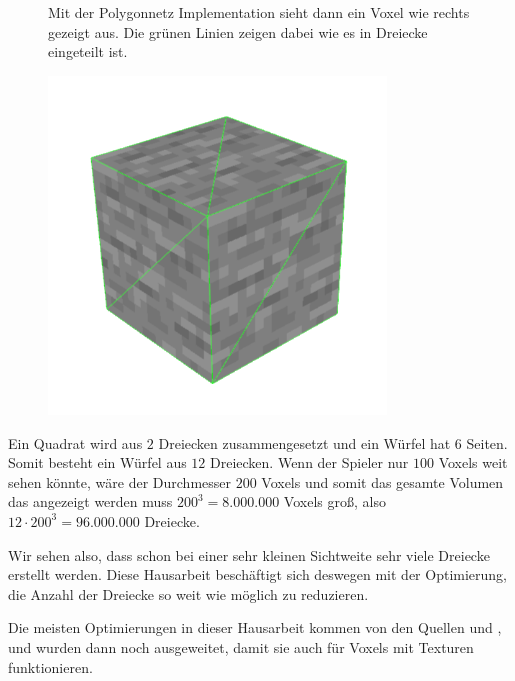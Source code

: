 \begin{figure}[ht]
	\begin{minipage}[c]{0.48\textwidth}
Mit der Polygonnetz Implementation sieht dann ein
Voxel wie rechts gezeigt aus.
Die grünen Linien zeigen dabei wie es in Dreiecke
eingeteilt ist.
	\end{minipage}
	\begin{minipage}[c]{0.5\textwidth}
		\begin{center}
\includegraphics[width=0.8\textwidth]{../assets/single_voxel.png}
		\end{center}
	\end{minipage}\hfill
\end{figure}

\goodbreak

Ein Quadrat wird aus $2$ Dreiecken zusammengesetzt
und ein Würfel hat $6$ Seiten. Somit besteht ein Würfel
aus $12$ Dreiecken. Wenn der Spieler nur $100$ Voxels
weit sehen könnte, wäre der Durchmesser $200$ Voxels
und somit das gesamte Volumen das angezeigt werden
muss $200^3 = 8.000.000$ Voxels groß, also
$12 \cdot 200^3 = 96.000.000$ Dreiecke.

Wir sehen also, dass schon bei einer sehr kleinen
Sichtweite sehr viele Dreiecke erstellt werden.
Diese Hausarbeit beschäftigt sich deswegen mit der
Optimierung, die Anzahl der Dreiecke so weit wie
möglich zu reduzieren.

Die meisten Optimierungen in dieser Hausarbeit
kommen von den Quellen \cite{yt_bin_greedy_mesher}
und \cite{gh_bin_greedy_mesher}, und wurden dann
noch ausgeweitet, damit sie auch für
Voxels mit Texturen funktionieren.
